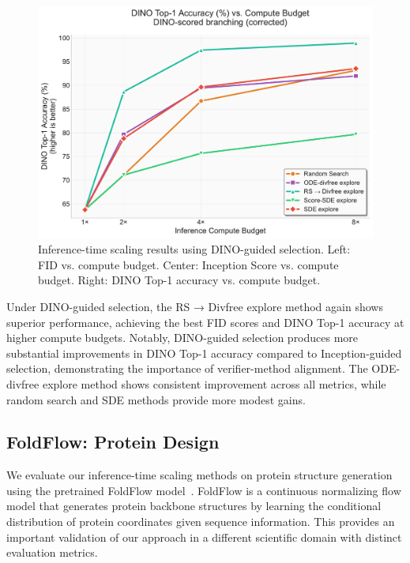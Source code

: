 \documentclass{article}
\begin{document}
\begin{figure}[H]
\begin{minipage}{0.32\textwidth}
  \end{minipage}
  \hfill
  \begin{minipage}{0.32\textwidth}
    \centering
    \includegraphics[width=\textwidth]{figures/scaling_dino_top1.pdf}
  \end{minipage}
  \caption{Inference-time scaling results using DINO-guided selection. Left: FID vs. compute budget. Center: Inception Score vs. compute budget. Right: DINO Top-1 accuracy vs. compute budget.}
  \label{fig:dino-scaling}
\end{figure}

Under DINO-guided selection, the RS → Divfree explore method again shows superior performance, achieving the best FID scores and DINO Top-1 accuracy at higher compute budgets. Notably, DINO-guided selection produces more substantial improvements in DINO Top-1 accuracy compared to Inception-guided selection, demonstrating the importance of verifier-method alignment. The ODE-divfree explore method shows consistent improvement across all metrics, while random search and SDE methods provide more modest gains.

\subsection{FoldFlow: Protein Design}

We evaluate our inference-time scaling methods on protein structure generation using the pretrained FoldFlow model~\cite{wu2024foldflow}. FoldFlow is a continuous normalizing flow model that generates protein backbone structures by learning the conditional distribution of protein coordinates given sequence information. This provides an important validation of our approach in a different scientific domain with distinct evaluation metrics.
\end{document}
